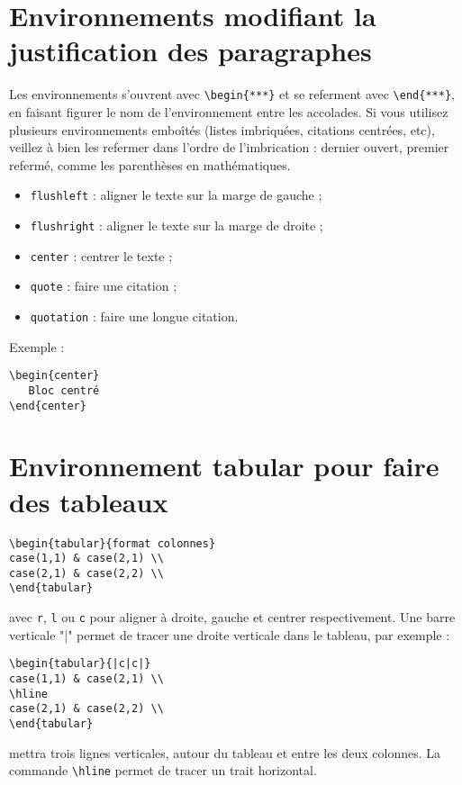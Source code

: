 \section{Environnements modifiant la justification des paragraphes}
Les environnements s'ouvrent avec \verb?\begin{***}? et se referment avec \verb?\end{***}?, en faisant figurer le nom de l'environnement entre les accolades. Si vous utilisez plusieurs environnements emboîtés (listes imbriquées, citations centrées, etc), veillez à bien les refermer dans l'ordre de l'imbrication : dernier ouvert, premier refermé, comme les parenthèses en mathématiques.
\begin{itemize}
\item \verb?flushleft? : aligner le texte sur la marge de gauche ;
\item \verb?flushright? : aligner le texte sur la marge de droite ;
\item \verb?center? : centrer le texte ;
\item \verb?quote? : faire une citation ;
\item \verb?quotation? : faire une longue citation.
\end{itemize}

Exemple :
\begin{verbatim}
\begin{center}
   Bloc centré
\end{center}
\end{verbatim}

\section{Environnement tabular pour faire des tableaux}
\begin{verbatim}
\begin{tabular}{format colonnes}
case(1,1) & case(2,1) \\
case(2,1) & case(2,2) \\
\end{tabular}
\end{verbatim}
avec \verb?r?, \verb?l? ou \verb?c? pour aligner à droite, gauche et centrer respectivement. Une barre verticale "|" permet de tracer une droite verticale dans le tableau, par exemple :
\begin{verbatim}
\begin{tabular}{|c|c|}
case(1,1) & case(2,1) \\
\hline
case(2,1) & case(2,2) \\
\end{tabular}
\end{verbatim}
mettra trois lignes verticales, autour du tableau et entre les deux colonnes. La commande \verb?\hline? permet de tracer un trait horizontal.

